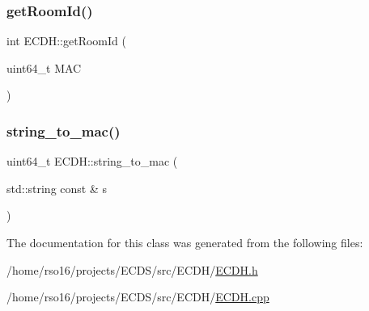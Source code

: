 \mbox{\label{classECDH_ac552676079ed12da22501ead4d15500b}} 
\subsubsection{\texorpdfstring{get\+Room\+Id()}{getRoomId()}}
{\footnotesize\ttfamily int E\+C\+D\+H\+::get\+Room\+Id (\begin{DoxyParamCaption}\item[{uint64\+\_\+t}]{M\+AC }\end{DoxyParamCaption})}

\mbox{\label{classECDH_a0b5fb1d5817ba51fe4e055190c3c88f2}} 
\subsubsection{\texorpdfstring{string\+\_\+to\+\_\+mac()}{string\_to\_mac()}}
{\footnotesize\ttfamily uint64\+\_\+t E\+C\+D\+H\+::string\+\_\+to\+\_\+mac (\begin{DoxyParamCaption}\item[{std\+::string const \&}]{s }\end{DoxyParamCaption})}



The documentation for this class was generated from the following files\+:\begin{DoxyCompactItemize}
\item 
/home/rso16/projects/\+E\+C\+D\+S/src/\+E\+C\+D\+H/\hyperlink{ECDH_8h}{E\+C\+D\+H.\+h}\item 
/home/rso16/projects/\+E\+C\+D\+S/src/\+E\+C\+D\+H/\hyperlink{ECDH_8cpp}{E\+C\+D\+H.\+cpp}\end{DoxyCompactItemize}
